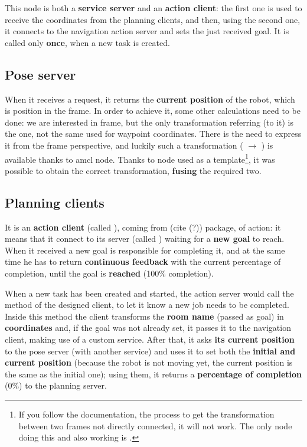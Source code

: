 This node is both a \textbf{service server} and an \textbf{action client}: the first one is used to receive the coordinates from the planning clients, and then, using the second one, it connects to the navigation action server and sets the just received goal. It is called only \textbf{once}, when a new task is created.

\subsection{Pose server}
\label{sub:pose}

When it receives a request, it returns the \textbf{current position} of the robot, which is  position in the  frame. In order to achieve it, some other calculations need to be done: we are interested in  frame, but the only transformation referring (to it) is the  one, not the same used for waypoint coordinates. There is the need to express it from the  frame perspective, and luckily such a transformation ( $\rightarrow$ ) is available thanks to \acrshort{amcl} node. 
Thanks to  node \cite{tfexample} used as a template\footnote{If you follow the documentation, the process to get the transformation between two frames not directly connected, it will not work. The only node doing this and also working is .}, it was possible to obtain the correct transformation, \textbf{fusing} the required two.

\subsection{Planning clients}

It is an \textbf{action client} (called ), coming from  (cite (?)) package, of  action: it means that it connect to its server (called ) waiting for a \textbf{new goal} to reach. When it received a new goal is responsible for completing it, and at the same time he has to return \textbf{continuous feedback
} with the current percentage of completion, until the goal is \textbf{reached} (100\% completion).

When a new task has been created and started, the action server would call the  method of the designed client, to let it know a new job needs to be completed.
Inside this method the client transforms the \textbf{room name} (passed as goal) in \textbf{coordinates} and, if the goal was not already set, it passes it to the navigation client, making use of a custom service. After that, it asks \textbf{its current position} to the pose server (with another service) and uses it to set both the \textbf{initial and current position} (because the robot is not moving yet, the current position is the same as the initial one); using them, it returns a \textbf{percentage of completion} (0\%) to the planning server.


